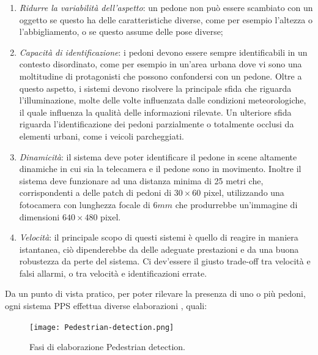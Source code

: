 \begin{enumerate}
    \item \emph{Ridurre la variabilità dell'aspetto}: un pedone non può essere scambiato 
    con un oggetto se questo ha delle caratteristiche diverse, come per 
    esempio l'altezza o l'abbigliamento, o se questo assume delle pose 
    diverse;
    \item \emph{Capacità di identificazione}: i pedoni devono essere sempre identificabili 
    in un contesto disordinato, come per esempio in un'area urbana 
    dove vi sono una moltitudine di protagonisti che possono confondersi 
    con un pedone. Oltre a questo aspetto, i sistemi devono risolvere la 
    principale sfida che riguarda l'illuminazione, molte delle volte influenzata 
    dalle condizioni meteorologiche, il quale influenza la qualità delle 
    informazioni rilevate. Un ulteriore sfida riguarda l'identificazione dei 
    pedoni parzialmente o totalmente occlusi da elementi urbani, come i 
    veicoli parcheggiati. 
    \item \emph{Dinamicità}: il sistema deve poter identificare il pedone in scene 
    altamente dinamiche in cui sia la telecamera e il pedone sono in 
    movimento. Inoltre il sistema deve funzionare ad una distanza minima 
    di 25 metri che, corrispondenti a delle patch di pedoni di $30\times 60$ 
    pixel, utilizzando una fotocamera con lunghezza focale di $6 mm$ che 
    produrrebbe un'immagine di dimensioni $640\times 480$ pixel.
    \item \emph{Velocità}: il principale scopo di questi sistemi è quello di reagire in 
    maniera istantanea, ciò dipenderebbe da delle adeguate prestazioni e 
    da una buona robustezza da perte del sistema. Ci dev'essere il giusto 
    trade-off tra velocità e falsi allarmi, o tra velocità e identificazioni 
    errate.
\end{enumerate}
Da un punto di vista pratico, per poter rilevare la presenza di uno o più 
pedoni, ogni sistema PPS effettua diverse elaborazioni \cite{pedestrian-detection}, quali:
\begin{figure}
    \centering
    \texttt{[image: Pedestrian-detection.png]}
    \centering
    \caption{Fasi di elaborazione Pedestrian detection.}
    \label{ped-det}
\end{figure}
